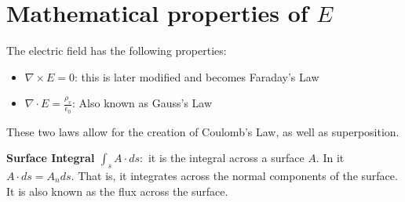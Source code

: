 \documentclass[nobib]{tufte-handout}
\newcommand{\defn}[2]{
        \begin{defbox}
        \noindent\textbf{#1}:\ #2
        \end{defbox}
}
\begin{document}
\section{Mathematical properties of $E$}
The electric field has the following properties:
\begin{itemize}
    \item $\nabla \times E = 0$: this is later modified and becomes Faraday's Law
    \item $\nabla \cdot E = \frac{\rho_v}{\epsilon_0}$: Also known as Gauss's Law
\end{itemize}
These two laws allow for the creation of Coulomb's Law, as well as superposition.
\defn{Surface Integral $\int_s A\cdot ds$}{it is the integral across a surface $A$. In it $A\cdot ds = A_n ds$. That is, it integrates across the normal components of the surface. It is also known as the flux across the surface.}
\end{document}
